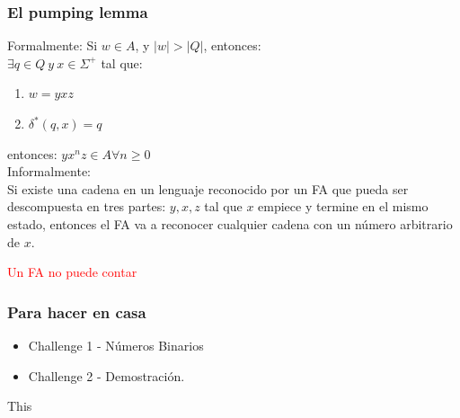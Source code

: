 \begin{frame}
    \frametitle{El pumping lemma}
    Formalmente:
    Si $w \in A$, y $|w| > |Q|$, entonces: \\
    \vspace{2mm}
    $\exists q\in Q~y~x \in \Sigma^{+}$ tal que:
    \begin{enumerate}
        \item $w = yxz$
        \item $\delta^*(q,x) = q$
    \end{enumerate}
    entonces: $yx^nz \in A \forall n \geq 0$\\
    \pause
    Informalmente:\\
    Si existe una cadena en un lenguaje reconocido por un FA que pueda ser descompuesta en tres partes: $y,x,z$ tal que $x$ empiece y termine 
    en el mismo estado, entonces el FA va a reconocer cualquier cadena con un n\'umero arbitrario de $x$.
\end{frame}


\begin{frame}
    \huge{\textcolor{red}{Un FA no puede contar}}
\end{frame}


\begin{frame}
    \frametitle{Para hacer en casa}
    \begin{itemize}
        \item Challenge 1 - Números Binarios
        \item Challenge 2 - Demostraci\'on.
    \end{itemize}This 
\end{frame}
